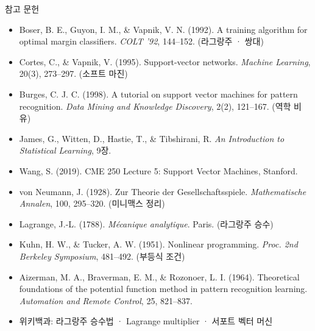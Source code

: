 \documentclass[aspectratio=169,11pt,t]{beamer}
\newcommand{\paperlink}[1]{\href{#1}{\textcolor{ksablue}{\faLink}}}
\begin{document}
\begin{frame}{참고 문헌}
\vfill
\scriptsize
\begin{itemize}
\setlength{\itemsep}{0.25em}
\item Boser, B. E., Guyon, I. M., \& Vapnik, V. N. (1992). A training algorithm for optimal margin classifiers. \textit{COLT '92}, 144--152. \;(라그랑주 · 쌍대) \paperlink{https://doi.org/10.1145/130385.130401}
\item Cortes, C., \& Vapnik, V. (1995). Support-vector networks. \textit{Machine Learning}, 20(3), 273--297. \;(소프트 마진) \paperlink{https://doi.org/10.1007/BF00994018}
\item Burges, C. J. C. (1998). A tutorial on support vector machines for pattern recognition. \textit{Data Mining and Knowledge Discovery}, 2(2), 121--167. \;(역학 비유) \paperlink{https://doi.org/10.1023/A:1009715923555}
\item James, G., Witten, D., Hastie, T., \& Tibshirani, R. \textit{An Introduction to Statistical Learning}, 9장. \paperlink{https://doi.org/10.1007/978-1-0716-1418-1}
\item Wang, S. (2019). CME 250 Lecture 5: Support Vector Machines, Stanford. \paperlink{https://web.stanford.edu/class/cme250/files/cme250_lecture5.pdf}
\item von Neumann, J. (1928). Zur Theorie der Gesellschaftsspiele. \textit{Mathematische Annalen}, 100, 295--320. \;(미니맥스 정리) \paperlink{https://doi.org/10.1007/BF01448847}
\item Lagrange, J.-L. (1788). \textit{Mécanique analytique}. Paris. \;(라그랑주 승수)
\item Kuhn, H. W., \& Tucker, A. W. (1951). Nonlinear programming. \textit{Proc. 2nd Berkeley Symposium}, 481--492. \;(부등식 조건) \paperlink{https://projecteuclid.org/euclid.bsmsp/1200500249}
\item Aizerman, M. A., Braverman, E. M., \& Rozonoer, L. I. (1964). Theoretical foundations of the potential function method in pattern recognition learning. \textit{Automation and Remote Control}, 25, 821--837.
\item 위키백과: 라그랑주 승수법 \paperlink{https://ko.wikipedia.org/wiki/\%EB\%9D\%BC\%EA\%B7\%B8\%EB\%9E\%91\%EC\%A3\%BC_\%EC\%8A\%B9\%EC\%88\%98\%EB\%B2\%95} \;·\; Lagrange multiplier \paperlink{https://en.wikipedia.org/wiki/Lagrange_multiplier} \;·\; 서포트 벡터 머신 \paperlink{https://ko.wikipedia.org/wiki/\%EC\%84\%9C\%ED\%8F\%AC\%ED\%8A\%B8_\%EB\%B2\%A1\%ED\%84\%B0_\%EB\%A8\%B8\%EC\%8B\%A0}
\end{itemize}
\vfill
{}
\end{frame}
\end{document}

